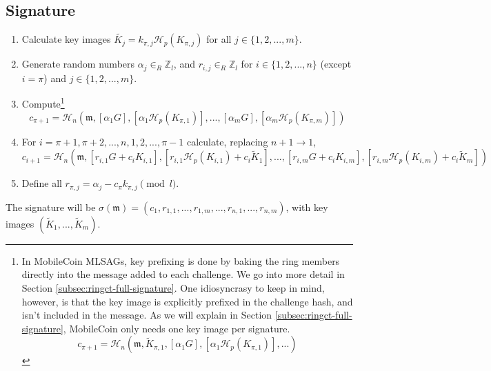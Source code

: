 \subsection*{Signature}

\begin{enumerate}
	\item Calculate key images \(\tilde{K_j} = k_{\pi, j} \mathcal{H}_p(K_{\pi, j})\) for all \(j \in \{1, 2, ..., m\}\).

	\item Generate random numbers  \(\alpha_j \in_R \mathbb{Z}_l\), and \(r_{i, j} \in_R \mathbb{Z}_l\) for \(i \in \{1, 2, ..., n\}\) (except \(i = \pi\)) and \(j \in \{1, 2, ..., m\}\).

	\item Compute\footnote{\label{footnote:mobilecoin-challenge-ideosyncracies}In MobileCoin MLSAGs, key prefixing is done by baking the ring members directly into the message added to each challenge. We go into more detail in Section \ref{subsec:ringct-full-signature}. One idiosyncrasy to keep in mind, however, is that the key image is explicitly prefixed in the challenge hash, and isn't included in the message. As we will explain in Section \ref{subsec:ringct-full-signature}, MobileCoin only needs one key image per signature.\vspace{-.15cm}
	\[c_{\pi+1} = \mathcal{H}_n(\mathfrak{m}, \tilde{K}_{\pi, 1}, [\alpha_1 G], [\alpha_1 \mathcal{H}_p(K_{\pi, 1})], ...)
	\]}
	\[c_{\pi+1} = \mathcal{H}_n(\mathfrak{m}, [\alpha_1 G], [\alpha_1 \mathcal{H}_p(K_{\pi, 1})], ..., [\alpha_m G], [\alpha_m \mathcal{H}_p(K_{\pi, m})])\]

	\item For \(i = \pi+1, \pi+2, ..., n, 1, 2, ..., \pi-1\) calculate, replacing \(n + 1 \rightarrow 1\),\vspace{.175cm}
	\[ c_{i+1} = \mathcal{H}_n(\mathfrak{m}, [r_{i, 1} G + c_i K_{i, 1}], [r_{i, 1} \mathcal{H}_p(K_{i, 1}) + c_i \tilde{K}_1], 
	..., [r_{i, m} G + c_i K_{i, m}], [r_{i, m} \mathcal{H}_p(K_{i, m}) + c_i \tilde{K}_m])\]

	\item Define all \(r_{\pi, j} = \alpha_j - c_\pi k_{\pi, j} \pmod l\).
\end{enumerate}

The signature will be \(\sigma(\mathfrak{m}) = (c_1, r_{1, 1}, ..., r_{1, m}, ..., r_{n, 1}, ..., r_{n, m}) \), with key images $(\tilde{K}_1, ...,  \tilde{K}_m)$.

